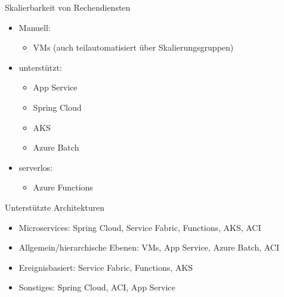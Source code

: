 \begin{flashcard}[]{Skalierbarkeit von Rechendiensten}
  \begin{itemize}
    \item Manuell:
      \begin{itemize}
        \item VMs (auch teilautomatisiert über Skalierungsgruppen)
      \end{itemize}
    \item unterstützt:
      \begin{itemize}
        \item App Service
        \item Spring Cloud
        \item AKS
        \item Azure Batch
      \end{itemize}
    \item serverlos:
      \begin{itemize}
        \item Azure Functions
      \end{itemize}
  \end{itemize}
\end{flashcard}

\begin{flashcard}[]{Unterstützte Architekturen}
  \begin{itemize}
    \item Microservices:\newline
      Spring Cloud, Service Fabric, Functions, AKS, ACI
    \item Allgemein/hierarchische Ebenen:\newline
      VMs, App Service, Azure Batch, ACI
    \item Ereignisbasiert:\newline
      Service Fabric, Functions, AKS
    \item Sonstiges:\newline
      Spring Cloud, ACI, App Service
  \end{itemize}
\end{flashcard}


